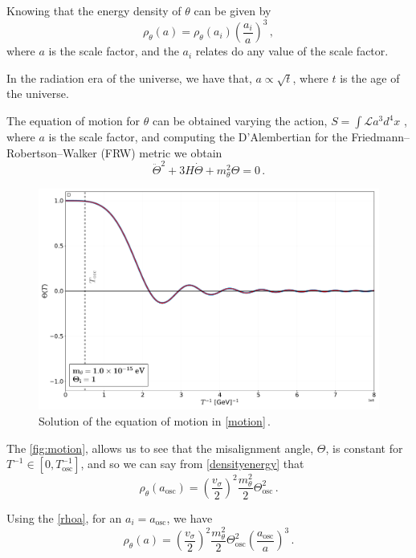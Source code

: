 Knowing that the energy density of $\theta$ can be given by
\begin{equation}
\label{rhoa}
    \rho_\theta(a)=\rho_\theta(a_i)\left(\dfrac{a_i}{a}\right)^3\,,
\end{equation}
where $a$ is the scale factor, and the $a_i$ relates do any value of the scale factor.

In the radiation era of the universe, we have that, $a\propto \sqrt{t}$, where $t$ is the age of the universe.

The equation of motion for $\theta$ can be obtained varying the action, $S=\int \mathcal{L} a^3 d^4x$ , where $a$
is the scale factor, and computing the D’Alembertian for the Friedmann–Robertson–Walker (FRW) metric we obtain\cite{Marsh_2016}
\begin{equation}
\label{motion}
    \ddot{\Theta}^2+3H\dot{\Theta}+m_\theta^2\Theta=0\,.
\end{equation}

\begin{figure}[H]
	\centering
	\includegraphics[width=0.9\linewidth]{graphs/motion.pdf}
	\caption{Solution of the equation of motion in \autoref{motion}\,.}
	\label{fig:motion}
\end{figure}

The \autoref{fig:motion}, allows us to see that the misalignment angle, $\Theta$, is constant for $T^{-1}\in[0,T^{-1}_{\textrm{osc}}]$, and so we can say from \autoref{densityenergy} that
\begin{equation}
    \rho_\theta(a_\textrm{osc})=\left(\dfrac{v_\sigma}{2}\right)^2\dfrac{m_\theta^2}{2}\Theta_\textrm{osc}^2\,.
\end{equation}

Using the \autoref{rhoa}, for an $a_i=a_\textrm{osc}$, we have
\begin{equation}
\label{rhoaa}
    \rho_\theta(a)=\left(\dfrac{v_\sigma}{2}\right)^2\dfrac{m_\theta^2}{2}\Theta_\textrm{osc}^2\left(\dfrac{a_\textrm{osc}}{a}\right)^3\,.
\end{equation}

